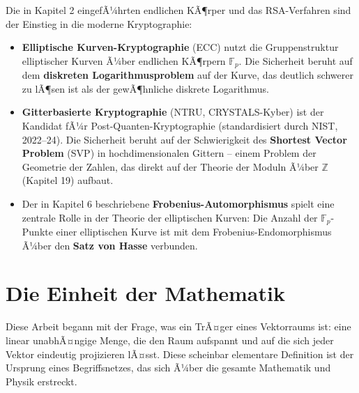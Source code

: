 ﻿\documentclass[a4paper,12pt]{report}
\theoremstyle{definition}
\begin{document}
Die in Kapitel 2 eingefÃ¼hrten endlichen KÃ¶rper und das
RSA-Verfahren sind der Einstieg in die moderne Kryptographie:
\begin{itemize}
    \item[-] \textbf{Elliptische Kurven-Kryptographie} (ECC)
          nutzt die Gruppenstruktur elliptischer Kurven Ã¼ber
          endlichen KÃ¶rpern $\mathbb{F}_p$. Die Sicherheit beruht
          auf dem \textbf{diskreten Logarithmusproblem} auf der
          Kurve, das deutlich schwerer zu lÃ¶sen ist als der
          gewÃ¶hnliche diskrete Logarithmus.
    \item[-] \textbf{Gitterbasierte Kryptographie} (NTRU, CRYSTALS-Kyber)
          ist der Kandidat fÃ¼r Post-Quanten-Kryptographie
          (standardisiert durch NIST, 2022--24). Die Sicherheit
          beruht auf der Schwierigkeit des \textbf{Shortest
          Vector Problem} (SVP) in hochdimensionalen Gittern --
          einem Problem der Geometrie der Zahlen, das direkt
          auf der Theorie der Moduln Ã¼ber $\mathbb{Z}$
          (Kapitel 19) aufbaut.
    \item[-] Der in Kapitel 6 beschriebene
          \textbf{Frobenius-Automorphismus} spielt eine
          zentrale Rolle in der Theorie der
          elliptischen Kurven: Die Anzahl der $\mathbb{F}_p$-Punkte
          einer elliptischen Kurve ist mit dem Frobenius-Endomorphismus
          Ã¼ber den \textbf{Satz von Hasse} verbunden.
\end{itemize}

\section{Die Einheit der Mathematik}

Diese Arbeit begann mit der Frage, was ein TrÃ¤ger eines Vektorraums ist: eine linear
unabhÃ¤ngige Menge, die den Raum aufspannt und auf die sich
jeder Vektor eindeutig projizieren lÃ¤sst. Diese scheinbar
elementare Definition ist der Ursprung eines Begriffsnetzes,
das sich Ã¼ber die gesamte Mathematik und Physik erstreckt.
\end{document}
